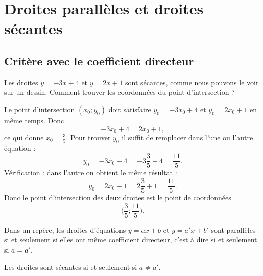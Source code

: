 \section{Droites parallèles et droites sécantes}

\subsection{Critère avec le coefficient directeur}

\begin{example}
    Les droites \( y=-3x+4\) et \( y=2x+1\) sont sécantes, comme nous pouvons le voir sur un dessin. Comment trouver les coordonnées du point d'intersection ?

    Le point d'intersection \( (x_0;y_0)\) doit satisfaire \( y_0=-3x_0+4\) et \( y_0=2x_0+1\) en même temps. Donc
    \begin{equation}
        -3x_0+4=2x_0+1,
    \end{equation}
    ce qui donne \( x_0=\frac{ 3 }{ 5 }\). Pour trouver \( y_0\) il suffit de remplacer dans l'une ou l'autre équation :
    \begin{equation}
        y_0=-3x_0+4=-3\frac{ 3 }{ 5 }+4=\frac{ 11 }{ 5 }.
    \end{equation}
    Vérification : dans l'autre on obtient le même résultat :
    \begin{equation}
        y_0=2x_0+1=2\frac{ 3 }{ 5 }+1=\frac{ 11 }{ 5 }.
    \end{equation}
    Donc le point d'intersection des deux droites est le point de coordonnées
    \begin{equation}
        \big( \frac{ 3 }{ 5 };\frac{ 11 }{ 5 } \big).
    \end{equation}
\end{example}

\begin{theorem}
    Dans un repère, les droites d'équations \( y=ax+b\) et \( y=a'x+b'\) sont parallèles si et seulement si elles ont même coefficient directeur, c'est à dire si et seulement si \( a=a'\).

    Les droites sont sécantes si et seulement si \( a\neq a'\).
\end{theorem}


